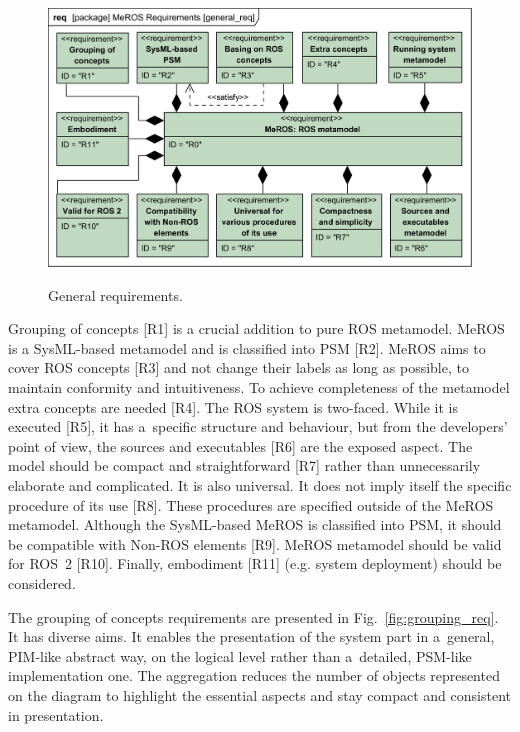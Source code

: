 \documentclass[11pt,oneside,a4paper]{report}
\begin{document}
	\begin{figure}[H]
		\centering
		\begin{center}
			{\includegraphics[scale=1.0]{diagrams/general_req.png}}
		\end{center}
		\caption{General requirements.}
		\label{fig:general_req}
	\end{figure}
		
	Grouping of concepts [R1] is a crucial addition to pure ROS metamodel. 
	MeROS is a  SysML-based metamodel and is classified into PSM [R2].
	 MeROS aims to cover ROS concepts [R3] and not change their labels as long as possible, to maintain conformity and intuitiveness. To achieve completeness of the metamodel extra concepts are needed [R4]. The ROS system is two-faced. While it is executed [R5], it has a~specific structure and behaviour, but from the developers' point of view, the sources and executables [R6] are the exposed aspect. The model should be compact and straightforward [R7] rather than unnecessarily elaborate and complicated. It is also universal. It does not imply itself the specific procedure of its use [R8]. These procedures are specified outside of the MeROS metamodel. Although the SysML-based MeROS is classified into PSM, it should be compatible with Non-ROS elements [R9]. MeROS metamodel should be valid for ROS~2 [R10]. Finally, embodiment [R11] (e.g. system deployment) should be considered.
	
	The grouping of concepts requirements are presented in Fig.~\ref{fig:grouping_req}. It has diverse aims. It enables the presentation of the system part in a~general, PIM-like abstract way, on the logical level rather than a~detailed, PSM-like implementation one. The aggregation reduces the number of objects represented on the diagram to highlight the essential aspects and stay compact and consistent in presentation.
	
\end{document}
